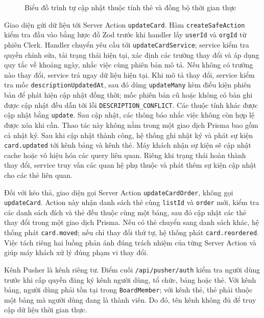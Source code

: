 \documentclass[../DoAn.tex]{subfiles}
\begin{document}
\begin{figure}[H]
    \centering
    \caption{Biểu đồ trình tự cập nhật thuộc tính thẻ và đồng bộ thời gian thực}
    \label{fig:chapter4_sequence_realtime}
\end{figure}

Giao diện gửi dữ liệu tới Server Action \texttt{updateCard}. Hàm \texttt{createSafeAction} kiểm tra đầu vào bằng lược đồ Zod trước khi handler lấy \texttt{userId} và \texttt{orgId} từ phiên Clerk. Handler chuyển yêu cầu tới \texttt{updateCardService}; service kiểm tra quyền chỉnh sửa, tải trạng thái hiện tại, xác định các trường thay đổi và áp dụng quy tắc về khoảng ngày, nhắc việc cùng phiên bản mô tả. Nếu không có trường nào thay đổi, service trả ngay dữ liệu hiện tại. Khi mô tả thay đổi, service kiểm tra mốc \texttt{descriptionUpdatedAt}, sau đó dùng \texttt{updateMany} kèm điều kiện phiên bản để phát hiện cập nhật đồng thời; mốc phiên bản cũ hoặc không có bản ghi được cập nhật đều dẫn tới lỗi \texttt{DESCRIPTION\_CONFLICT}. Các thuộc tính khác được cập nhật bằng \texttt{update}. Sau cập nhật, các thông báo nhắc việc không còn hợp lệ được xóa khi cần. Thao tác này không nằm trong một giao dịch Prisma bao gồm cả nhật ký. Sau khi cập nhật thành công, hệ thống ghi nhật ký và phát sự kiện \texttt{card.updated} tới kênh bảng và kênh thẻ. Máy khách nhận sự kiện sẽ cập nhật cache hoặc vô hiệu hóa các query liên quan. Riêng khi trạng thái hoàn thành thay đổi, service truy vấn các quan hệ phụ thuộc và phát thêm sự kiện cập nhật cho các thẻ liên quan.

Đối với kéo thả, giao diện gọi Server Action \texttt{updateCardOrder}, không gọi \texttt{updateCard}. Action này nhận danh sách thẻ cùng \texttt{listId} và \texttt{order} mới, kiểm tra các danh sách đích và thẻ đều thuộc cùng một bảng, sau đó cập nhật các thẻ thay đổi trong một giao dịch Prisma. Nếu có thẻ chuyển sang danh sách khác, hệ thống phát \texttt{card.moved}; nếu chỉ thay đổi thứ tự, hệ thống phát \texttt{card.reordered}. Việc tách riêng hai luồng phản ánh đúng trách nhiệm của từng Server Action và giúp máy khách xử lý đúng phạm vi thay đổi.

Kênh Pusher là kênh riêng tư. Điểm cuối \texttt{/api/pusher/auth} kiểm tra người dùng trước khi cấp quyền đăng ký kênh người dùng, tổ chức, bảng hoặc thẻ. Với kênh bảng, người dùng phải tồn tại trong \texttt{BoardMember}; với kênh thẻ, thẻ phải thuộc một bảng mà người dùng đang là thành viên. Do đó, tên kênh không đủ để truy cập dữ liệu thời gian thực.
\end{document}
